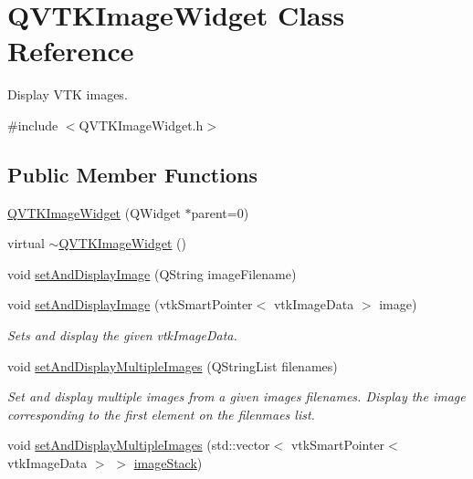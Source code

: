 \hypertarget{class_q_v_t_k_image_widget}{\section{Q\-V\-T\-K\-Image\-Widget Class Reference}
\label{d8/dd7/class_q_v_t_k_image_widget}
}


Display V\-T\-K images.  




{\ttfamily \#include $<$Q\-V\-T\-K\-Image\-Widget.\-h$>$}

\subsection*{Public Member Functions}
\begin{DoxyCompactItemize}
\item 
\hyperlink{class_q_v_t_k_image_widget_ab32cec8874449b586d7fbf6eac7e6b8d}{Q\-V\-T\-K\-Image\-Widget} (Q\-Widget $\ast$parent=0)
\item 
virtual \hyperlink{class_q_v_t_k_image_widget_a60ba9a3e24a288e7a73cfca5caaf7393}{$\sim$\-Q\-V\-T\-K\-Image\-Widget} ()
\item 
void \hyperlink{class_q_v_t_k_image_widget_a99ccfbda431140e785a672432b500743}{set\-And\-Display\-Image} (Q\-String image\-Filename)
\item 
void \hyperlink{class_q_v_t_k_image_widget_aebaa775058eebd750adbdb7c70fdd90a}{set\-And\-Display\-Image} (vtk\-Smart\-Pointer$<$ vtk\-Image\-Data $>$ image)
\begin{DoxyCompactList}\small\item\em Sets and display the given vtk\-Image\-Data. \end{DoxyCompactList}\item 
void \hyperlink{class_q_v_t_k_image_widget_acd43450864ef2c0cdd7b8d37f045d8fd}{set\-And\-Display\-Multiple\-Images} (Q\-String\-List filenames)
\begin{DoxyCompactList}\small\item\em Set and display multiple images from a given images filenames. Display the image corresponding to the first element on the filenmaes list. \end{DoxyCompactList}\item 
void \hyperlink{class_q_v_t_k_image_widget_ae2b3f8c58a1c1162ce506b6da4a49e4c}{set\-And\-Display\-Multiple\-Images} (std\-::vector$<$ vtk\-Smart\-Pointer$<$ vtk\-Image\-Data $>$ $>$ \hyperlink{class_q_v_t_k_image_widget_a336708e27578dab885b069f12c120138}{image\-Stack})

\end{DoxyCompactItemize}
